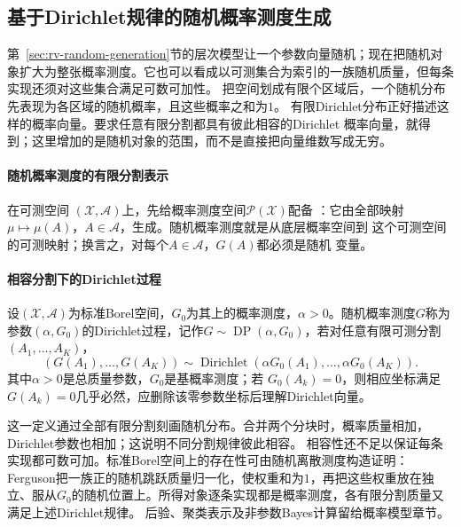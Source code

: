 \subsection{基于Dirichlet规律的随机概率测度生成}
\label{sec:stoch-random-probability-generation}
第~\ref{sec:rv-random-generation}节的层次模型让一个参数向量随机；现在把随机对象扩大为整张概率测度。它也可以看成以可测集合为索引的一族随机质量，但每条实现还须对这些集合满足可数可加性。
把空间划成有限个区域后，一个随机分布先表现为各区域的随机概率，且这些概率之和为$1$。
有限Dirichlet分布正好描述这样的概率向量。要求任意有限分割都具有彼此相容的Dirichlet
概率向量，就得到；这里增加的是随机对象的范围，而不是直接把向量维数写成无穷。
\paragraph{随机概率测度的有限分割表示}
\begin{definition}[随机概率测度]
  \label{def:probability-random-probability-measure}
在可测空间
\((\mathcal X,\mathcal A)\)上，先给概率测度空间\(\mathcal P(\mathcal X)\)配备
：它由全部映射
\(\mu\mapsto\mu(A)\)，\(A\in\mathcal A\)，生成。随机概率测度就是从底层概率空间到
这个可测空间的可测映射；换言之，对每个\(A\in\mathcal A\)，\(G(A)\)都必须是随机
变量。
\end{definition}
\paragraph{相容分割下的Dirichlet过程}
\begin{definition}[Dirichlet过程]
  \label{def:probability-dirichlet-process}
  设\((\mathcal X,\mathcal A)\)为标准Borel空间，\(G_0\)为其上的概率测度，\(\alpha>0\)。随机概率测度\(G\)称为参数\((\alpha,G_0)\)的Dirichlet过程，记作\(G\sim\operatorname{DP}(\alpha,G_0)\)，若对任意有限可测分割
\((A_1,\ldots,A_K)\)，
\[ (G(A_1),\ldots,G(A_K))
  \sim\operatorname{Dirichlet}(\alpha G_0(A_1),\ldots,\alpha G_0(A_K)). \]
其中\(\alpha>0\)是总质量参数，\(G_0\)是基概率测度；若
\(G_0(A_k)=0\)，则相应坐标满足\(G(A_k)=0\)几乎必然，应删除该零参数坐标后理解Dirichlet向量。
\end{definition}
这一定义通过全部有限分割刻画随机分布。合并两个分块时，概率质量相加，Dirichlet参数也相加；这说明不同分割规律彼此相容。
相容性还不足以保证每条实现都可数可加。标准Borel空间上的存在性可由随机离散测度构造证明：Ferguson把一族正的随机跳跃质量归一化，使权重和为\(1\)，再把这些权重放在独立、服从\(G_0\)的随机位置上。所得对象逐条实现都是概率测度，各有限分割质量又满足上述Dirichlet规律。
后验、聚类表示及非参数Bayes计算留给概率模型章节。

